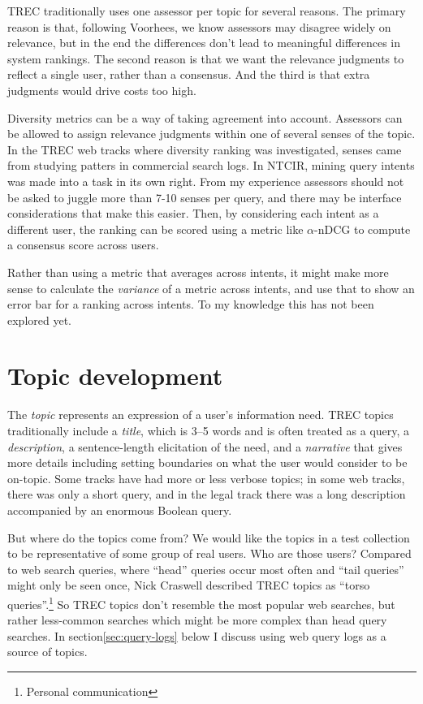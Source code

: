 \documentclass[nobib]{tufte-book}
\begin{document}
TREC traditionally uses one assessor per topic for several reasons.  The primary reason is that, following Voorhees\autocite{voorhees_variations_1998}, we know assessors may disagree widely on relevance, but in the end the differences don't lead to meaningful differences in system rankings.  The second reason is that we want the relevance judgments to reflect a single user, rather than a consensus.  And the third is that extra judgments would drive costs too high.

Diversity metrics can be a way of taking agreement into account.  Assessors can be allowed to assign relevance judgments within one of several senses of the topic.  In the TREC web tracks where diversity ranking was investigated, senses came from studying patters in commercial search logs.  In NTCIR, mining query intents was made into a task in its own right.\autocite{liu_overview_2014}  From my experience assessors should not be asked to juggle more than 7-10 senses per query, and there may be interface considerations that make this easier.  Then, by considering each intent as a different user, the ranking can be scored  using a metric like $\alpha$-nDCG\autocite{sakai_which_2019} to compute a consensus score across users.

Rather than using a metric that averages across intents, it might make more sense to calculate the {\em variance} of a metric across intents, and use that to show an error bar for a ranking across intents.  To my knowledge this has not been explored yet.

\chapter{Topic development} \label{topic-development}

The {\em topic} represents an expression of a user's information need.  TREC topics traditionally include a {\em title}, which is 3--5 words and is often treated as a query, a {\em description}, a sentence-length elicitation of the need, and a {\em narrative} that gives more details including setting boundaries on what the user would consider to be on-topic.  Some tracks have had more or less verbose topics; in some web tracks, there was only a short query, and in the legal track there was a long description accompanied by an enormous Boolean query.

But where do the topics come from?  We would like the topics in a test collection to be representative of some group of real users.  Who are those users? Compared to web search queries, where ``head'' queries occur most often and ``tail queries'' might only be seen once, Nick Craswell described TREC topics as ``torso queries''.\footnote{Personal communication}  So TREC topics don't resemble the most popular web searches, but rather less-common searches which might be more complex than head query searches.  In section\ref{sec:query-logs} below I discuss using web query logs as a source of topics.
\end{document}
